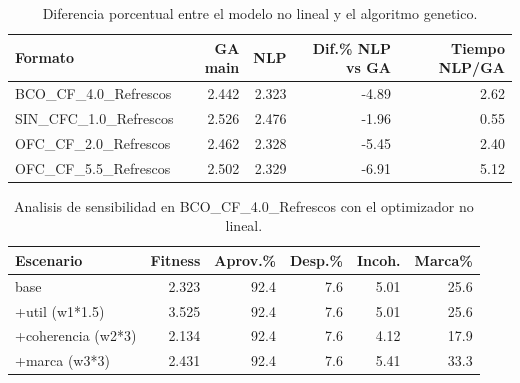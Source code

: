 \begin{table}[h]
\centering
\small
\renewcommand{\arraystretch}{1.18}
\begin{tabular}{lrrrr}
\toprule
\textbf{Formato} & \textbf{GA main} & \textbf{NLP} & \textbf{Dif.\% NLP vs GA} & \textbf{Tiempo NLP/GA} \\
\midrule
BCO\_CF\_4.0\_Refrescos & 2.442 & 2.323 & -4.89 & 2.62 \\
SIN\_CFC\_1.0\_Refrescos & 2.526 & 2.476 & -1.96 & 0.55 \\
OFC\_CF\_2.0\_Refrescos & 2.462 & 2.328 & -5.45 & 2.40 \\
OFC\_CF\_5.5\_Refrescos & 2.502 & 2.329 & -6.91 & 5.12 \\
\bottomrule
\end{tabular}
\caption{Diferencia porcentual entre el modelo no lineal y el algoritmo genetico.}
\end{table}

\begin{table}[h]
\centering
\small
\renewcommand{\arraystretch}{1.18}
\begin{tabular}{lrrrrr}
\toprule
\textbf{Escenario} & \textbf{Fitness} & \textbf{Aprov.\%} & \textbf{Desp.\%} & \textbf{Incoh.} & \textbf{Marca\%} \\
\midrule
base & 2.323 & 92.4 & 7.6 & 5.01 & 25.6 \\
+util (w1*1.5) & 3.525 & 92.4 & 7.6 & 5.01 & 25.6 \\
+coherencia (w2*3) & 2.134 & 92.4 & 7.6 & 4.12 & 17.9 \\
+marca (w3*3) & 2.431 & 92.4 & 7.6 & 5.41 & 33.3 \\
\bottomrule
\end{tabular}
\caption{Analisis de sensibilidad en BCO\_CF\_4.0\_Refrescos con el optimizador no lineal.}
\end{table}
